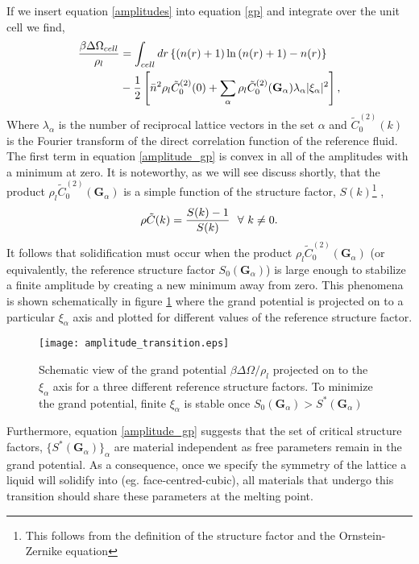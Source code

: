 If we insert equation \ref{amplitudes} into equation \ref{gp} and integrate
over the unit cell we find,
%
\begin{align}
    \label{amplitude_gp} 
    \frac{\beta \Delta\Omega_{cell}}{\rho_l} &=  \int_{cell} 
        dr \left\lbrace (n(r) + 1)\ln\left(n(r) + 1\right) - n(r) \right\rbrace \nonumber \\
    &- \frac{1}{2} \left[\bar{n} ^ 2 \rho_l\tilde{C}^{(2)}_0(0) + \sum_\alpha\rho_l\tilde{C}^{(2)}_0
            (\mathbf{G}_\alpha) \lambda_\alpha\vert\xi_\alpha\vert^2\right],
\end{align}
%
Where $\lambda_\alpha$ is the number of reciprocal lattice vectors in the set
$\alpha$ and $\tilde{C}^{(2)}_0(k)$ is the Fourier transform of the direct
correlation function of the reference fluid. The first term in equation
\ref{amplitude_gp} is convex in all of the amplitudes with a minimum at zero.
It is noteworthy, as we will see discuss shortly, that the product 
$\rho_l \tilde{C}^{(2)}_0(\mathbf{G}_\alpha)$ is a simple function of the 
structure factor, $S(k)$\footnote{This follows from the definition of the 
structure factor and the Ornstein-Zernike equation}
,
%
\begin{equation}
    \rho \tilde{C}(k) = \frac{S(k) - 1}{S(k)}\,\,\,\,\forall \,\,k \ne 0.
\end{equation}
%
It follows that solidification must occur when the product $\rho_l
\tilde{C}^{(2)}_0(\mathbf{G}_\alpha)$ (or equivalently, the reference structure
factor $S_0(\mathbf{G}_\alpha)$) is large enough to stabilize a finite
amplitude by creating a new minimum away from zero.  This phenomena is shown
schematically in figure \ref{fig:amplitude_transition} where the grand
potential is projected on to a particular $\xi_\alpha$ axis and plotted for
different values of the reference structure factor.
%
\begin{figure}
    \centering
    \texttt{[image: amplitude\_transition.eps]}
    \caption[Grand Potential through the Solidification transition]{ 
        Schematic view of the grand potential $\beta\Delta\Omega / \rho_l$
        projected on to the $\xi_\alpha$ axis for a three different reference
        structure factors. To minimize the grand potential, finite $\xi_\alpha$
        is stable once $S_0(\mathbf{G}_\alpha) > S^*(\mathbf{G}_\alpha)$
    }\label{fig:amplitude_transition}
\end{figure}
%
Furthermore, equation \ref{amplitude_gp} suggests that the set of critical
structure factors, $\lbrace S^*(\mathbf{G}_\alpha)\rbrace_\alpha$ are material
independent as free parameters remain in the grand potential.
As a consequence, once we specify the symmetry of the lattice a liquid will
solidify into (eg. face-centred-cubic), all materials that undergo this
transition should share these parameters at the melting point. 

